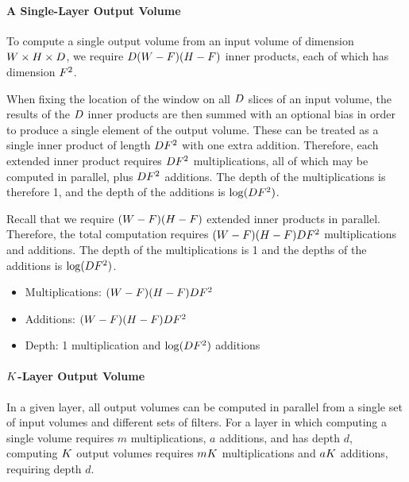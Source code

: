 \paragraph{A Single-Layer Output Volume}

To compute a single output volume from an input volume of dimension $W \times H \times D$,
we require $D (W-F)(H-F)$ inner products, each of which has dimension $F^{2}$.

When fixing the location of the window on all $D$ slices of an input volume, the results of the $D$ inner products are then summed with an optional bias in order to produce a single element of the output volume.
These can be treated as a single inner product of length $D F^{2}$ with one extra addition. Therefore, each extended inner product requires $D F^{2}$ multiplications, all of which may be computed in parallel, plus $D F^{2}$ additions. The depth of the multiplications is therefore 1, and the depth of the additions is $\log(D F^{2})$.

Recall that we require $(W-F)(H-F)$ extended inner products in parallel. Therefore, the total computation requires $(W-F)(H-F)D F^{2}$ multiplications and additions. The depth of the multiplications is 1 and the depths of the additions is $\log(D F^{2})$.


\begin{itemize}
	\item Multiplications: $(W-F)(H-F) D F^{2}$
	\item Additions: $(W-F)(H-F) D F^{2}$
	\item Depth: 1 multiplication and $\log(D F^{2})$ additions
\end{itemize}

\paragraph{$K$-Layer Output Volume}
In a given layer, all output volumes can be computed in parallel from a single set of input volumes and different sets of filters.
For a layer in which computing a single volume requires $m$ multiplications, $a$ additions, and has depth $d$,
computing $K$ output volumes requires $mK$ multiplications and $aK$ additions, requiring depth $d$.

